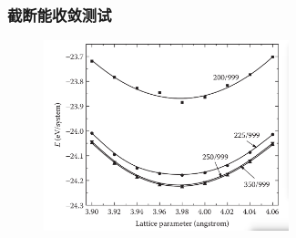 %
\frame
{
	\frametitle{截断能收敛测试}
\begin{figure}[h!]
\centering
\includegraphics[width=2.8in,viewport=0 11 820 650,clip]{Figures/Pt_FCC-Ecut-convergence.png}
\caption{\fontsize{6.2pt}{5.2pt}}%
\label{Pt_FCC-energy-curve}
\end{figure}
{\fontsize{7.2pt}{5.2pt}\selectfont{不难预见，随着截断能的增加，计算时长将会增加($\vec k$点增加的情形类似)}}
}
